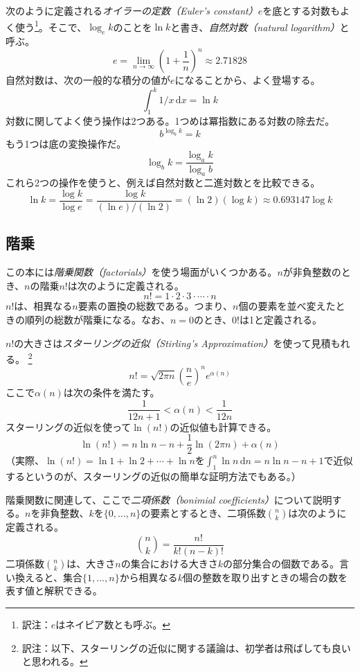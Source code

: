 %
%
次のように定義される\emph{オイラーの定数（Euler's constant）}$e$を底とする対数もよく使う\footnote{訳注：$e$はネイピア数とも呼ぶ。}。そこで、$\log_e k$のことを$\ln k$と書き、\emph{自然対数（natural logarithm）}と呼ぶ。%
%
\[
   e = \lim_{n\rightarrow\infty} \left(1+\frac{1}{n}\right)^n
   \approx  2.71828
\]
自然対数は、次の一般的な積分の値が$e$になることから、よく登場する。
\[
    \int_{1}^{k} 1/x\,\mathrm{d}x  = \ln k
\]
対数に関してよく使う操作は2つある。1つめは冪指数にある対数の除去だ。
\[
    b^{\log_b k} = k
\]
もう1つは底の変換操作だ。
\[
    \log_b k = \frac{\log_a k}{\log_a b}
\]
これら2つの操作を使うと、例えば自然対数と二進対数とを比較できる。
\[
   \ln k = \frac{\log k}{\log e} = \frac{\log k}{(\ln e)/(\ln 2)} =
    (\ln 2)(\log k) \approx 0.693147\log k
\]

\subsection{階乗}

この本には\emph{階乗関数（factorials）}を使う場面がいくつかある。$n$が非負整数のとき、$n$の階乗$n!$は次のように定義される。
\[
   n! = 1\cdot2\cdot3\cdot\cdots\cdot n
\]
$n!$は、相異なる$n$要素の置換の総数である。つまり、$n$個の要素を並べ変えたときの順列の総数が階乗になる。なお、$n=0$のとき、$0!$は1と定義される。

%
$n!$の大きさは\emph{スターリングの近似（Stirling's Approximation）}を使って見積もれる。
\footnote{訳注：以下、スターリングの近似に関する議論は、初学者は飛ばしても良いと思われる。}%
\[
  n!
   = \sqrt{2\pi n}\left(\frac{n}{e}\right)^{n}e^{\alpha(n)}
\]
ここで$\alpha(n)$は次の条件を満たす。
\[
   \frac{1}{12n+1} <  \alpha(n) < \frac{1}{12n}
\]
スターリングの近似を使って$\ln(n!)$の近似値も計算できる。
\[
   \ln(n!) = n\ln n - n + \frac{1}{2}\ln(2\pi n) + \alpha(n)
\]
（実際、$\ln(n!)=\ln 1 + \ln 2  + \cdots + \ln n$を$\int_1^n \ln n\,\mathrm{d}n = n\ln n - n +1$で近似するというのが、スターリングの近似の簡単な証明方法でもある。）

%
階乗関数に関連して、ここで\emph{二項係数（bonimial coefficients）}について説明する。$n$を非負整数、$k$を$\{0,\ldots,n\}$の要素とするとき、二項係数$\binom{n}{k}$は次のように定義される。
\[
   \binom{n}{k} = \frac{n!}{k!(n-k)!}
\]
二項係数$\binom{n}{k}$は、大きさ$n$の集合における大きさ$k$の部分集合の個数である。言い換えると、集合$\{1,\ldots,n\}$から相異なる$k$個の整数を取り出すときの場合の数を表す値と解釈できる。 %

